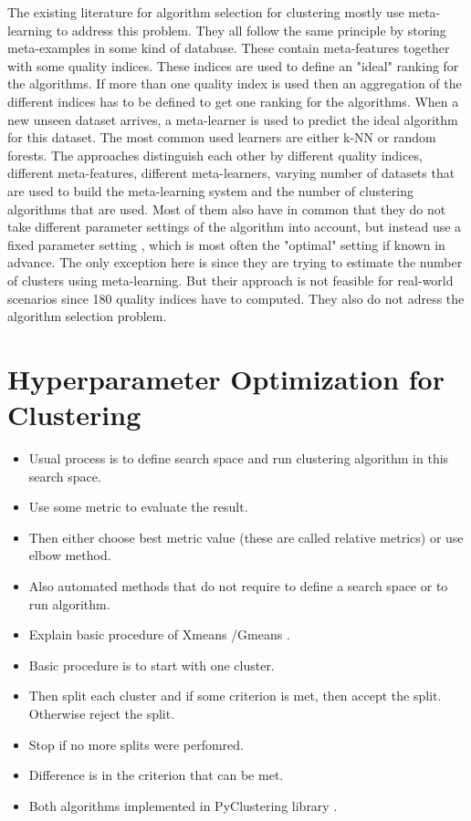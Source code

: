 The existing literature for algorithm selection for clustering mostly use meta-learning to address this problem.
They all follow the same principle by storing meta-examples in some kind of database.
These contain meta-features together with some quality indices.
These indices are used to define an "ideal" ranking for the algorithms.
If more than one quality index is used then an aggregation of the different indices has to be defined to get one ranking for the algorithms.
When a new unseen dataset arrives, a meta-learner is used to predict the ideal algorithm for this dataset.
The most common used learners are either k-NN or random forests.
The approaches distinguish each other by different quality indices, different meta-features, different meta-learners, varying number of datasets that are used to build the meta-learning system and the number of clustering algorithms that are used.
Most of them also have in common that they do not take different parameter settings of the algorithm into account, but instead use a fixed parameter setting , which is most often the "optimal" setting if known in advance. 
The only exception here is \cite{Corchado2019AConformations} since they are trying to estimate the number of clusters using meta-learning.
But their approach is not feasible for real-world scenarios since 180 quality indices have to computed.
They also do not adress the algorithm selection problem.

\section{Hyperparameter Optimization for Clustering}

\begin{itemize}
    \item Usual process is to define search space and run clustering algorithm in this search space.
    \item Use some metric to evaluate the result.
    \item Then either choose best metric value (these are called relative metrics) or use elbow method.
    \item Also automated methods that do not require to define a search space or to run algorithm.
    \item Explain basic procedure of Xmeans \cite{Pelleg2000X-means:Clusters} /Gmeans \cite{HamerlyLearningK-means}.
    \item Basic procedure is to start with one cluster.
    \item Then split each cluster and if some criterion is met, then accept the split.
    Otherwise reject the split.
    \item Stop if no more splits were perfomred.
    \item Difference is in the criterion that can be met.
    \item Both algorithms implemented in PyClustering library \cite{NovikovPyClustering:Archive}.
    
\end{itemize}


